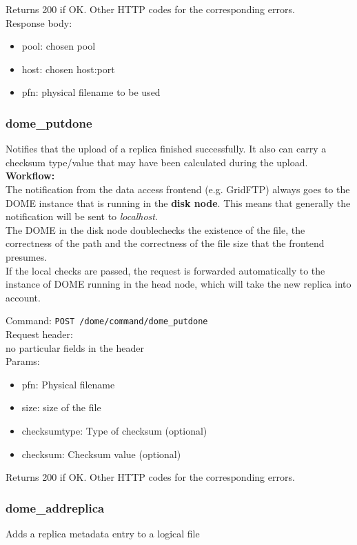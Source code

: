 \documentclass[a4paper,10pt]{scrreprt}
\begin{document}
Returns 200 if OK. Other HTTP codes for the corresponding errors.\\
Response body:
\begin{itemize}
 \item pool: chosen pool
 \item host: chosen host:port
 \item pfn: physical filename to be used
\end{itemize}

\subsubsection{dome\_putdone}
Notifies that the upload of a replica finished successfully. It also can carry a checksum type/value that may have been calculated during the upload.\\

\textbf{Workflow:}\\
The notification from the data access frontend (e.g. GridFTP) always goes to the DOME instance that is running in the \textbf{disk node}. This means that
generally the notification will be sent to \textit{localhost}.\\
The DOME in the disk node doublechecks the existence of the file, the correctness of the path and the correctness of the file size that the frontend presumes.\\
If the local checks are passed, the request is forwarded automatically to the instance of DOME running in the head node, which will take the new replica into account.

Command:
\lstinline"POST /dome/command/dome_putdone"\\
Request header:\\
 no particular fields in the header\\

Params:
\begin{itemize}
 \item pfn: Physical filename
 \item size: size of the file
 \item checksumtype: Type of checksum (optional)
 \item checksum: Checksum value (optional)
\end{itemize}

Returns 200 if OK. Other HTTP codes for the corresponding errors.\\


\subsubsection{dome\_addreplica}
Adds a replica metadata entry to a logical file
\end{document}
